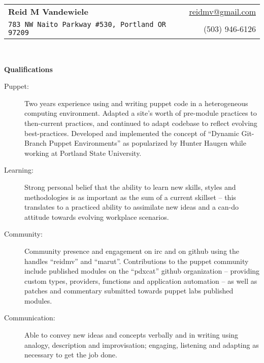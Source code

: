 \documentclass[letterpaper,11pt]{article}
\makeatletter
\newcommand{\resheading}[1]{
  {
    \large \colorbox{mygrey}{
      \begin{minipage}{\textwidth}{
        \textbf{#1 \vphantom{p\^{E}}}
      }\end{minipage}
    }
  }
}
\newcommand{\mywebheader}{
  \begin{tabular*}{7in}{l@{\extracolsep{\fill}}r}
    \textbf{\LARGE \textcolor{mygreylink}
      {Reid M Vandewiele}
    }
    & \href{mailto:reidmv@gmail.com}{reidmv@gmail.com}\\
    {\footnotesize \texttt
      {783 NW Naito Parkway \#530, Portland OR 97209}
    }
    & \textcolor{mygreylink}{{(503) 946-6126}}\\
  \end{tabular*}\\
  \vspace{0.1in}
}
\makeatother
\begin{document}
\mywebheader

\resheading{Qualifications}
  \begin{description}
    \item[Puppet:] { \footnotesize
      Two years experience using and writing puppet code in a heterogeneous
      computing environment. Adapted a site's worth of pre-module practices to
      then-current practices, and continued to adapt codebase to reflect
      evolving best-practices. Developed and implemented the concept of 
      ``Dynamic Git-Branch Puppet Environments'' as popularized by Hunter
      Haugen while working at Portland State University.
    }
    \item[Learning:] { \footnotesize
      Strong personal belief that the ability to learn new skills, styles
      and methodologies is as important as the sum of a current skillset --
      this translates to a practiced ability to assimilate new ideas and a
      can-do attitude towards evolving workplace scenarios.
    }
    \item[Community:] { \footnotesize
      Community presence and engagement on {\sc irc} and on {\sc g}it{\sc h}ub using the
      handles ``reidmv'' and ``marut''. Contributions to the {\sc p}uppet community
      include published modules on the ``pdxcat'' {\sc g}it{\sc h}ub organization --
      providing custom types, providers, functions and application automation
      -- as well as patches and commentary submitted towards {\sc p}uppet {\sc l}abs
      published modules.
    }
    \item[Communication:] { \footnotesize
      Able to convey new ideas and concepts verbally and in writing using
      analogy, description and improvisation; engaging, listening and adapting
      as necessary to get the job done.
    }
  \end{description} %
\end{document}
